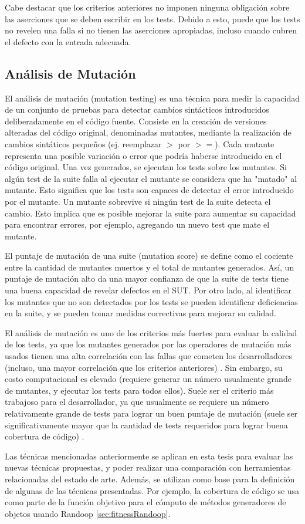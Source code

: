 Cabe destacar que los criterios anteriores no imponen ninguna obligación sobre
las aserciones que se deben escribir en los tests. Debido a esto, puede que los
tests no revelen una falla si no tienen las aserciones apropiadas, incluso
cuando cubren el defecto con la entrada adecuada.  

\subsection{Análisis de Mutación}

El análisis de mutación (mutation testing) es una técnica para medir la
capacidad de un conjunto de pruebas para detectar cambios sintácticos
introducidos deliberadamente en el código fuente. Consiste en la creación de versiones 
alteradas del código original, denominadas mutantes, mediante la realización de
cambios sintáticos pequeños (ej. reemplazar $>$ por $>=$). Cada mutante representa una 
posible variación o error que podría haberse introducido en el código original.
Una vez generados, se ejecutan los tests sobre los mutantes. 
Si algún test de la suite falla al ejecutar el mutante se considera que ha
"matado" al mutante. Esto significa que los tests son capaces de detectar el error 
introducido por el mutante. Un mutante sobrevive si ningún test de la suite 
detecta el cambio. Esto implica que es posible mejorar la suite para aumentar su capacidad 
para encontrar errores, por ejemplo, agregando un nuevo test que mate el mutante.

El puntaje de mutación de una suite (mutation score) se define como
el cociente entre la cantidad de mutantes muertos y el total de mutantes
generados. Así, un puntaje de mutación alto da una mayor confianza de que la suite 
de tests tiene una buena capacidad de revelar defectos en el SUT. 
Por otro lado, al identificar los mutantes que no son detectados por los tests 
se pueden identificar deficiencias en la suite, y se pueden tomar medidas 
correctivas para mejorar su calidad.

El análisis de mutación es uno de los criterios más fuertes para evaluar la 
calidad de los tests, ya que los mutantes generados por las operadores de 
mutación más usados 
tienen una alta correlación con las fallas que cometen los desarrolladores 
(incluso, una mayor correlación que los criterios anteriores) \cite{}. Sin
embargo, su costo computacional es elevado (requiere generar un
número usualmente grande de mutantes, y ejecutar los tests para todos ellos). 
Suele ser el criterio más trabajoso para el desarrollador, ya que usualmente 
se requiere un número relativamente grande de tests para lograr un buen puntaje 
de mutación (suele ser significativamente mayor que la cantidad de tests
    requeridos para lograr buena cobertura de código) \cite{}.

Las técnicas mencionadas anteriormente se aplican en esta tesis para evaluar las 
nuevas técnicas propuestas, y poder realizar una comparación con herramientas
relacionadas del estado de arte. Además, se utilizan como base para la
definición de algunas de las técnicas presentadas. Por ejemplo, la cobertura de
código se usa como parte de la función objetivo para el cómputo de métodos
generadores de objetos usando Randoop \ref{sec:fitnessRandoop}.